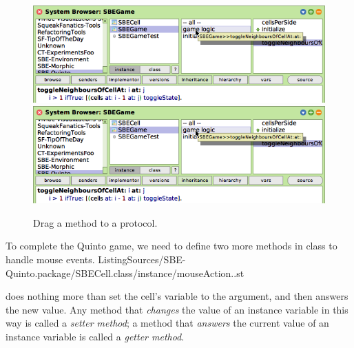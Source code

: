 \documentclass[a4paper,10pt,twoside]{book}
\begin{document}
\begin{figure}[htbp]
   \centering
   \ifluluelse
		{\includegraphics[width=\textwidth]{DragMethod} }
		{\includegraphics[scale=0.7]{DragMethod} }
   \caption{Drag a method to a protocol.\label{fig:dragMethod}}
\end{figure}

To complete the Quinto game, we need to define two more methods in class  to handle mouse events.
%
{ListingSources/SBE-Quinto.package/SBECell.class/instance/mouseAction..st}

 does nothing more than set the cell's  variable to the argument, and then answers the new value.
Any method that \emph{changes} the value of an instance variable in this way is called a \emph{setter method}; a method that \emph{answers} the current value of an instance variable is called a \emph{getter method}.
\end{document}
